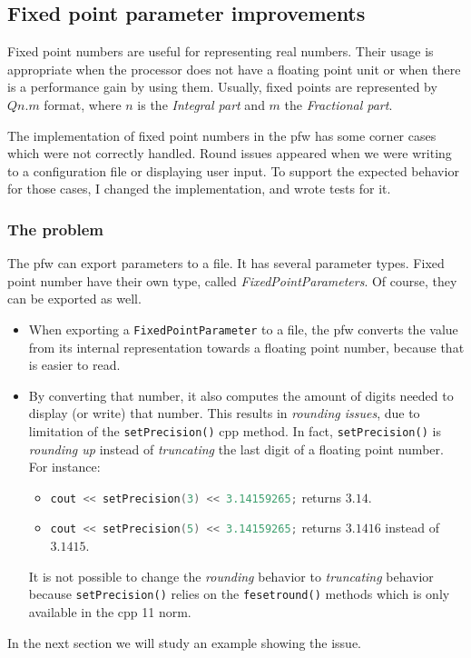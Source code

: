 \subsection{Fixed point parameter improvements}
Fixed point numbers are useful for representing real numbers. Their
usage is appropriate when the processor does not have a floating point unit
or when there is a performance gain by using them. Usually, fixed points are
represented by $Qn.m$ format, where $n$ is the \emph{Integral part} and $m$ the
\emph{Fractional part}.

The implementation of fixed point numbers in the \gls{pfw} has some
corner cases which were not correctly handled. Round issues appeared when we
were writing to a configuration file or displaying user input. To
support the expected behavior for those cases, I changed the implementation, and
wrote tests for it.

\subsubsection{The problem}
The \gls{pfw} can export parameters to a file. It has several parameter types.
Fixed point number have their own type, called \emph{FixedPointParameters}. Of course, they can be exported as well.
\begin{itemize}
    \item When exporting a \lstinline{FixedPointParameter} to a file, the \gls{pfw} converts the value from
        its internal representation towards a floating point number, because that is
        easier to read.
    \item By converting that number, it also computes the amount of digits needed to display (or write) that number.
        This results in \emph{rounding issues}, due to limitation of the \lstinline{setPrecision()} \gls{cpp} method.
        In fact, \lstinline{setPrecision()} is \emph{rounding up} instead of \emph{truncating} the last digit of a floating point number.
        For instance:
        \begin{itemize}
            \item \lstinline[language=C++]{cout << setPrecision(3) << 3.14159265;} returns $3.14$.
            \item \lstinline[language=C++]{cout << setPrecision(5) << 3.14159265;} returns $3.1416$ instead of $3.1415$.
        \end{itemize}
        It is not possible to change the \emph{rounding} behavior to \emph{truncating} behavior because
        \lstinline{setPrecision()} relies on the \lstinline{fesetround()} methods which is only available in the \gls{cpp} 11 norm.
\end{itemize}
In the next section we will study an example showing the issue.

